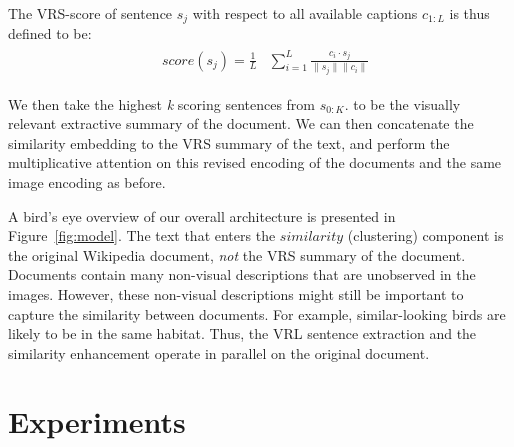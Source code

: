 \documentclass[11pt,a4paper]{article}
\newcommand\gal[1]{\textcolor{bright}{\textbf{GAL:} #1 }}
\newcommand\yuval[1]{\textcolor{darkpink}{\textbf{YUVAL:} #1 }}
\newcommand\tzuf[1]{\textcolor{blue}{\textbf{TZUF:} #1 }}
\newcommand\reut[1]{\textcolor{green}{\textbf{REUT:} #1 }}
\begin{document}
The VRS-score of sentence $s_j$ with respect to all available captions  $c_{1:L}$ is thus defined to be:
\begin{equation}
\begin{aligned}
\begin{split}
\label{eq:score}
&score(s_j)= \frac{1}{L}
&\sum_{i=1}^{L} \frac{c_i\cdot s_j}{\| s_j\|\| c_i\| }
\end{split}
\end{aligned}
\end{equation}


We then take the highest \textit{k} scoring sentences from \(s_{0:K}\). 
to be the visually relevant extractive summary of the document. We can then concatenate the similarity embedding to the VRS summary of the text, and perform the multiplicative attention on this revised encoding of the documents and the same image encoding as before.\par

A bird's eye 
overview of our overall architecture is presented in Figure~\ref{fig:model}.
The text that enters the $similarity$ (clustering) component is the original Wikipedia document, {\em not} the VRS summary of the document. Documents contain many non-visual descriptions that are unobserved in the images. However, these non-visual descriptions might still be important to capture the similarity between documents. For example, similar-looking birds are likely to be in the same habitat. Thus, the VRL sentence extraction and the similarity enhancement  operate in parallel on the original document. 
\section{Experiments}
\end{document}
